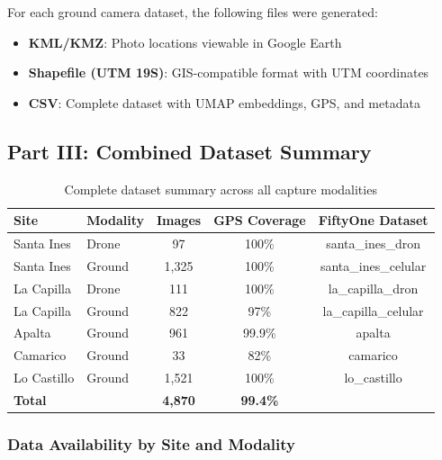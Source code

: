 For each ground camera dataset, the following files were generated:

\begin{itemize}
    \item \textbf{KML/KMZ}: Photo locations viewable in Google Earth
    \item \textbf{Shapefile (UTM 19S)}: GIS-compatible format with UTM coordinates
    \item \textbf{CSV}: Complete dataset with UMAP embeddings, GPS, and metadata
\end{itemize}

\subsection{Part III: Combined Dataset Summary}

\begin{table}[H]
\centering
\caption{Complete dataset summary across all capture modalities}
\label{tab:all_datasets}
\begin{tabular}{llccc}
\toprule
\textbf{Site} & \textbf{Modality} & \textbf{Images} & \textbf{GPS Coverage} & \textbf{FiftyOne Dataset} \\
\midrule
Santa Ines & Drone & 97 & 100\% & santa\_ines\_dron \\
Santa Ines & Ground & 1,325 & 100\% & santa\_ines\_celular \\
La Capilla & Drone & 111 & 100\% & la\_capilla\_dron \\
La Capilla & Ground & 822 & 97\% & la\_capilla\_celular \\
Apalta & Ground & 961 & 99.9\% & apalta \\
Camarico & Ground & 33 & 82\% & camarico \\
Lo Castillo & Ground & 1,521 & 100\% & lo\_castillo \\
\midrule
\multicolumn{2}{l}{\textbf{Total}} & \textbf{4,870} & \textbf{99.4\%} & \\
\bottomrule
\end{tabular}
\end{table}


\subsubsection{Data Availability by Site and Modality}

